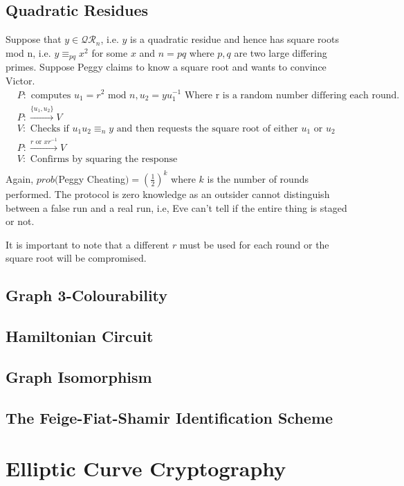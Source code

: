 \documentclass[12pt,a4paper]{article}
\begin{document}
\subsection{Quadratic Residues}
Suppose that $y \in \mathcal{QR}_{n}$, i.e. $y$ is a quadratic residue and hence has square roots mod n, i.e. $y \equiv_{pq} x^{2}$ for some $x$ and $n = pq$ where $p, q$ are two large differing primes. Suppose Peggy claims to know a square root and wants to convince Victor. 
\begin{align*}
	&P: \text{ computes } u_{1} = r^{2} \text{ mod } n, u_{2} = yu_{1}^{-1} \text{ Where r is a random number differing each round.} \\
	&P: \xrightarrow{\{u_1, u_2\}} V \\
	&V: \text{ Checks if } u_{1}u_{2} \equiv_{n} y \text{ and then requests the square root of either } u_{1} \text{ or } u_{2} \\
	&P: \xrightarrow{r \text{ or } xr^{-1}} V \\
	&V: \text{ Confirms by squaring the response} \\ 
\end{align*}
Again, $prob($Peggy Cheating$) = \left(\frac{1}{2}\right)^{k}$ where $k$ is the number of rounds performed. The protocol is zero knowledge as an outsider cannot distinguish between a false run and a real run, i.e, Eve can't tell if the entire thing is staged or not. 

It is important to note that a different $r$ must be used for each round or the square root will be compromised.  


\subsection{Graph 3-Colourability}
\subsection{Hamiltonian Circuit}
\subsection{Graph Isomorphism}
\subsection{The Feige-Fiat-Shamir Identification Scheme}

\section{Elliptic Curve Cryptography}
\end{document}
